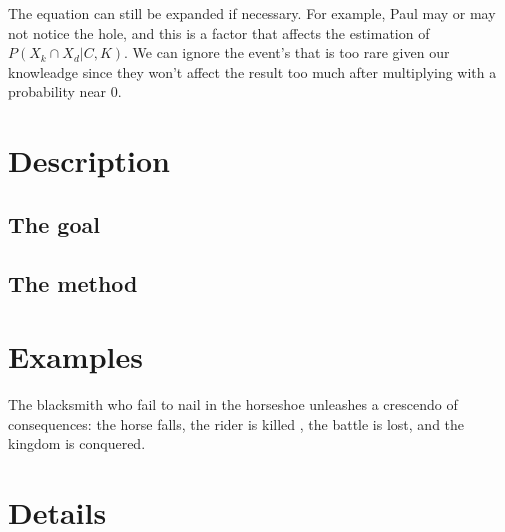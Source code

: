 \documentclass{manuscript}
\begin{document}
    The equation can still be expanded if necessary. For example, Paul may or may not notice the hole, and this is a
    factor that affects the estimation of $P(X_k \cap X_d | C, K)$. We can ignore the event's that is too rare given our
    knowleadge since they won't affect the result too much after multiplying with a probability near 0.

    \section{Description}

    \subsection{The goal}

    \subsection{The method}

    \section{Examples}

    The blacksmith who fail to nail in the horseshoe unleashes a crescendo of consequences: the horse falls, the rider is
    killed , the battle is lost, and the kingdom is conquered.

    \section{Details}

    
\end{document}
